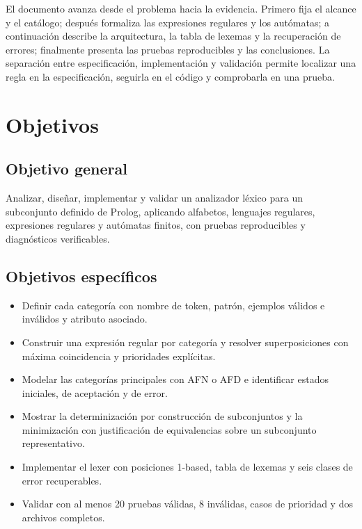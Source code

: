 \documentclass[11pt,letterpaper]{article}
\begin{document}
El documento avanza desde el problema hacia la evidencia. Primero fija el alcance y el catálogo; después formaliza las expresiones regulares y los autómatas; a continuación describe la arquitectura, la tabla de lexemas y la recuperación de errores; finalmente presenta las pruebas reproducibles y las conclusiones. La separación entre especificación, implementación y validación permite localizar una regla en la especificación, seguirla en el código y comprobarla en una prueba.

\section{Objetivos}

\subsection{Objetivo general}

Analizar, diseñar, implementar y validar un analizador léxico para un subconjunto definido de Prolog, aplicando alfabetos, lenguajes regulares, expresiones regulares y autómatas finitos, con pruebas reproducibles y diagnósticos verificables.

\subsection{Objetivos específicos}

\begin{itemize}
  \item Definir cada categoría con nombre de token, patrón, ejemplos válidos e inválidos y atributo asociado.
  \item Construir una expresión regular por categoría y resolver superposiciones con máxima coincidencia y prioridades explícitas.
  \item Modelar las categorías principales con AFN o AFD e identificar estados iniciales, de aceptación y de error.
  \item Mostrar la determinización por construcción de subconjuntos y la minimización con justificación de equivalencias sobre un subconjunto representativo.
  \item Implementar el lexer con posiciones 1-based, tabla de lexemas y seis clases de error recuperables.
  \item Validar con al menos 20 pruebas válidas, 8 inválidas, casos de prioridad y dos archivos completos.
\end{itemize}
\end{document}
